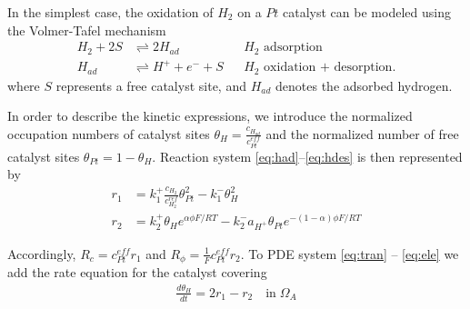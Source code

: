 \documentclass[english,nofirstpagebreak,empty]{amsproc}
\begin{document}
In the simplest case, the oxidation of $H_2$ on a $Pt$ catalyst can be
modeled      using      the      Volmer-Tafel      mechanism 
\cite{HamannVielstich1998}
\begin{subequations}
  \begin{align}  
    H_2 +2 S &\rightleftharpoons  2 H_{ad}  &&
         \text{$H_2$ adsorption} \label{eq:had}\\
    H_{ad} & \rightleftharpoons  H^+ +e^- +S 
&&\text{$H_2$ oxidation + desorption}\label{eq:hdes}.
  \end{align}
\end{subequations}  where $S$  represents  a free  catalyst site,  and
$H_{ad}$ denotes the adsorbed hydrogen.

In  order  to  describe  the  kinetic expressions,  we  introduce  the
normalized      occupation     numbers      of      catalyst     sites
$\theta_{H}=\frac{c_{H_{ad}}}{c^{eff}_{Pt}}$ and the normalized number
of  free  catalyst sites  $\theta_{Pt}=  1-\theta_{H}$.  Reaction
system \eqref{eq:had}--\eqref{eq:hdes} is then represented by
\begin{subequations}
\begin{align}
r_1 &= k_1^+ \frac{c_{H_2}}{c_{H_2}^{ref}}\theta_{Pt}^2-k_1^- \theta_{H}^2\\
r_2 &= k_2^+  \theta_{H} e^{\alpha \phi F/RT}-k_2^-  a_{H^+}\theta_{Pt}e^{-(1-\alpha)\phi F/RT}
\end{align}
\end{subequations} 

Accordingly,     $R_c=      c_{Pt}^{eff}r_1$     and     $     R_\phi=
\frac{1}{F}c_{Pt}^{eff}r_2$.        To            PDE       system
\eqref{eq:tran} -- \eqref{eq:ele} we add the rate equation for the
catalyst covering
\begin{align}\label{eq:theta}
  \frac {d \theta_{H}}{d t} = 2r_1-r_2 \quad\text{in}\; \Omega_A
\end{align}
\end{document}
